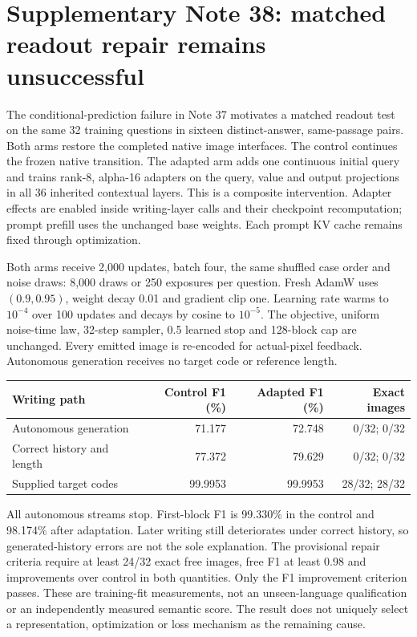 \documentclass[10pt,a4paper]{article}
\begin{document}
\clearpage
\section*{Supplementary Note 38: matched readout repair remains unsuccessful}
The conditional-prediction failure in Note 37 motivates a matched readout
test on the same 32 training questions in sixteen distinct-answer,
same-passage pairs. Both arms restore the completed native image interfaces.
The control continues the frozen native transition. The adapted arm adds one
continuous initial query and trains rank-8, alpha-16 adapters on the query,
value and output projections in all 36 inherited contextual layers. This is
a composite intervention. Adapter effects are enabled inside writing-layer
calls and their checkpoint recomputation; prompt prefill uses the unchanged
base weights. Each prompt KV cache remains fixed through optimization.

Both arms receive 2,000 updates, batch four, the same shuffled case order and
noise draws: 8,000 draws or 250 exposures per question. Fresh AdamW uses
$(0.9,0.95)$, weight decay 0.01 and gradient clip one. Learning rate warms to
$10^{-4}$ over 100 updates and decays by cosine to $10^{-5}$. The objective,
uniform noise-time law, 32-step sampler, 0.5 learned stop and 128-block cap are
unchanged. Every emitted image is re-encoded for actual-pixel feedback.
Autonomous generation receives no target code or reference length.

\begin{center}\small
\begin{tabular}{lrrr}
\toprule
Writing path & Control F1 (\%) & Adapted F1 (\%) & Exact images\\
\midrule
Autonomous generation & 71.177 & 72.748 & 0/32; 0/32\\
Correct history and length & 77.372 & 79.629 & 0/32; 0/32\\
Supplied target codes & 99.9953 & 99.9953 & 28/32; 28/32\\
\bottomrule
\end{tabular}
\end{center}

All autonomous streams stop. First-block F1 is 99.330\% in the control and
98.174\% after adaptation. Later writing still deteriorates under correct
history, so generated-history errors are not the sole explanation. The
provisional repair criteria require at least 24/32 exact free images, free F1
at least 0.98 and improvements over control in both quantities. Only the F1
improvement criterion passes. These are training-fit measurements, not an
unseen-language qualification or an independently measured semantic score.
The result does not uniquely select a representation, optimization or loss
mechanism as the remaining cause.
\end{document}
